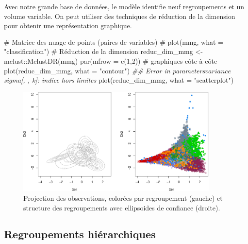 \documentclass[
  11pt,
  letterpaper,
]{book}
\newenvironment{Shaded}{\begin{snugshade}}{\end{snugshade}}
\newcommand{\AttributeTok}[1]{\textcolor[rgb]{0.40,0.45,0.13}{#1}}
\newcommand{\CommentTok}[1]{\textcolor[rgb]{0.37,0.37,0.37}{#1}}
\newcommand{\DecValTok}[1]{\textcolor[rgb]{0.68,0.00,0.00}{#1}}
\newcommand{\DocumentationTok}[1]{\textcolor[rgb]{0.37,0.37,0.37}{\textit{#1}}}
\newcommand{\FunctionTok}[1]{\textcolor[rgb]{0.28,0.35,0.67}{#1}}
\newcommand{\NormalTok}[1]{\textcolor[rgb]{0.00,0.23,0.31}{#1}}
\newcommand{\OtherTok}[1]{\textcolor[rgb]{0.00,0.23,0.31}{#1}}
\newcommand{\SpecialCharTok}[1]{\textcolor[rgb]{0.37,0.37,0.37}{#1}}
\newcommand{\StringTok}[1]{\textcolor[rgb]{0.13,0.47,0.30}{#1}}
\theoremstyle{definition}
\theoremstyle{remark}
\begin{document}
Avec notre grande base de données, le modèle identifie neuf
regroupements et un volume variable. On peut utiliser des techniques de
réduction de la dimension pour obtenir une représentation graphique.

\begin{Shaded}
\begin{Highlighting}[]
\CommentTok{\# Matrice des nuage de points (paires de variables)}
\CommentTok{\# plot(mmg, what = "classification")}
\CommentTok{\# Réduction de la dimension}
\NormalTok{reduc\_dim\_mmg }\OtherTok{\textless{}{-}}\NormalTok{ mclust}\SpecialCharTok{::}\FunctionTok{MclustDR}\NormalTok{(mmg)}
\FunctionTok{par}\NormalTok{(}\AttributeTok{mfrow =} \FunctionTok{c}\NormalTok{(}\DecValTok{1}\NormalTok{,}\DecValTok{2}\NormalTok{)) }\CommentTok{\# graphiques côte{-}à{-}côte}
\FunctionTok{plot}\NormalTok{(reduc\_dim\_mmg, }\AttributeTok{what =} \StringTok{"contour"}\NormalTok{)}
\DocumentationTok{\#\# Error in parameters$variance$sigma[, , k]: indice hors limites}
\FunctionTok{plot}\NormalTok{(reduc\_dim\_mmg, }\AttributeTok{what =} \StringTok{"scatterplot"}\NormalTok{)}
\end{Highlighting}
\end{Shaded}

\begin{figure}[ht!]

{\centering \includegraphics[width=0.9\textwidth,height=\textheight]{./03-regroupements_files/figure-pdf/fig-classifreducmclust-1.pdf}

}

\caption{\label{fig-classifreducmclust}Projection des observations,
colorées par regroupement (gauche) et structure des regroupements avec
ellipsoides de confiance (droite).}

\end{figure}

\hypertarget{regroupements-hiuxe9rarchiques}{%
\subsection{Regroupements
hiérarchiques}\label{regroupements-hiuxe9rarchiques}}
\end{document}
